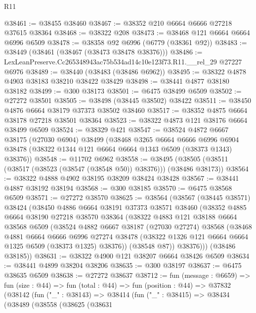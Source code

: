 \begin{lexlean}{R11}
\begin{coremodule}
@38461 := @38455 @38460
@38467 := @38352 @210 @6664 @6666 @27218 @37615 @38364
@38468 := @38322 @208
@38473 := @38468 @121 @6664 @6664 @6996 @6509
@38478 := @38358 @92 @6996 (@6779 (@38361 @92))
@38483 := @38449 (@38461 (@38467 (@38473 @38478 @38376)))
@38486 := LexLeanPreserve.Cc265348943ac75b534ad14c10e123f73.R11.__rel_29 @27227 @6976
@38489 := @38440 (@38483 (@38486 @6962))
@38495 := @38322 @4878 @4903 @38183 @38210 @38422 @38429
@38498 := @38441 @4877 @38180 @38182
@38499 := @300 @38173
@38501 := @6475 @38499 @6509
@38502 := @27272 @38501
@38505 := @38498 (@38445 @38502) @38422
@38511 := @38450 @4876 @6664 @38179 @37373 @38502 @38460
@38517 := @38352 @4875 @6664 @38178 @27218 @38501 @38364
@38523 := @38322 @4873 @121 @38176 @6664 @38499 @6509
@38524 := @38329 @421
@38547 := @38524
    @4872
    @6667
    @38175
    (@27030 @6904)
    @38499
    (@38468
      @3265
      @6664
      @6666
      @6996
      @6904
      @38478
      (@38322 @1344 @121 @6664 @6664 @1343 @6509 (@38373 @1343) @38376))
@38548 := @11702 @6962
@38558 := @38495 (@38505 (@38511 (@38517 (@38523 (@38547 (@38548 @50)) @38376))) (@38486 @38173))
@38564 := @38322 @4888 @4902 @38195 @38209 @38424 @38428
@38567 := @38441 @4887 @38192 @38194
@38568 := @300 @38185
@38570 := @6475 @38568 @6509
@38571 := @27272 @38570
@38625 := @38564
    (@38567
      (@38445 @38571)
      @38424
      (@38450
        @4886
        @6664
        @38191
        @37373
        @38571
        @38460
        (@38352
          @4885
          @6664
          @38190
          @27218
          @38570
          @38364
          (@38322
            @4883
            @121
            @38188
            @6664
            @38568
            @6509
            (@38524
              @4882
              @6667
              @38187
              (@27030 @27274)
              @38568
              (@38468
                @4881
                @6664
                @6666
                @6996
                @27274
                @38478
                (@38322 @1326 @121 @6664 @6664 @1325 @6509 (@38373 @1325) @38376))
              (@38548 @87))
            @38376)))
      (@38486 @38185))
@38631 := @38322 @4900 @121 @38207 @6664 @38426 @6509
@38634 := @38441 @4899 @38204 @38206
@38635 := @300 @38197
@38637 := @6475 @38635 @6509
@38638 := @27272 @38637
@38712 := fun (message : @6659) =>
  fun (size : @44) =>
  fun (total : @44) =>
  fun (position : @44) =>
  @37832
    (@38142
      (fun ("_" : @38143) =>
      @38414
        (fun ("_" : @38415) =>
        @38434
          (@38489
            (@38558
              (@38625
                (@38631

\end{coremodule}
\end{lexlean}
